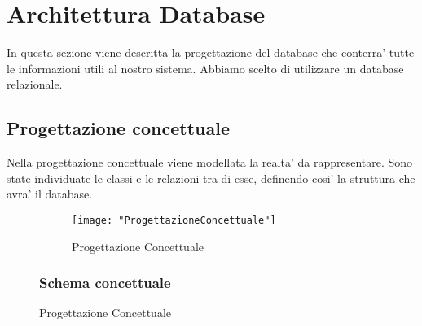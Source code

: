 \section{Architettura Database}{
	In questa sezione viene descritta la progettazione del database che conterra' tutte le informazioni utili al nostro sistema. Abbiamo scelto di utilizzare un database relazionale.
	
	\subsection{Progettazione concettuale}{
		Nella progettazione concettuale viene modellata la realta' da rappresentare. Sono state individuate le classi e le relazioni tra di esse, definendo cosi' la struttura che avra' il database.
		
		\begin{figure}[ht]
			\begin{subfigure}[b]{0.5\textwidth}
				\texttt{[image: "ProgettazioneConcettuale"]}
				\caption{Progettazione Concettuale}
				\label{Fig. Progettazione Concettuale}
			\end{subfigure}
			
			\subsubsection{Schema concettuale}
			

\end{figure}}}

